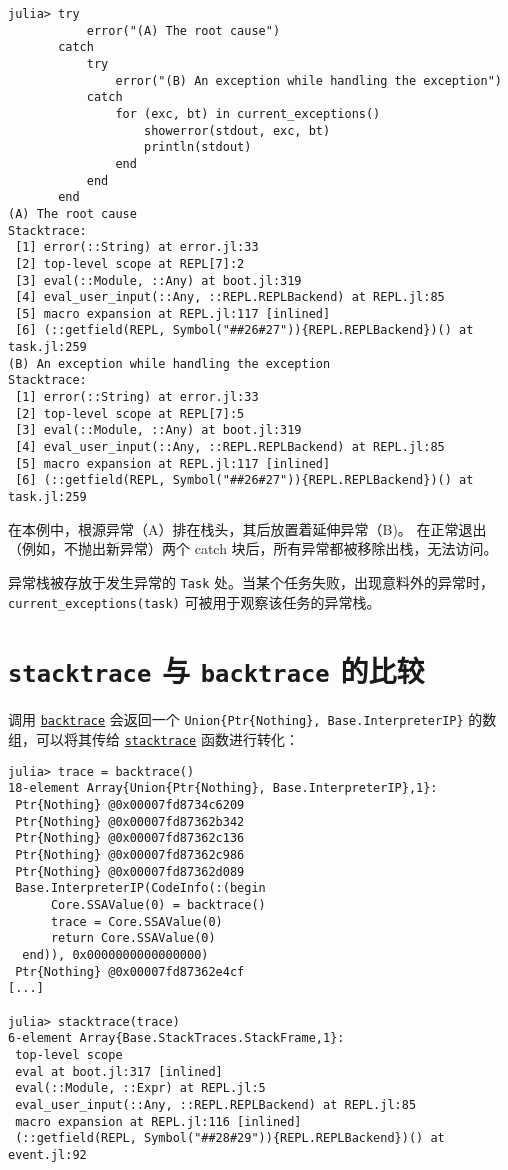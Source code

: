\begin{verbatim}
julia> try
           error("(A) The root cause")
       catch
           try
               error("(B) An exception while handling the exception")
           catch
               for (exc, bt) in current_exceptions()
                   showerror(stdout, exc, bt)
                   println(stdout)
               end
           end
       end
(A) The root cause
Stacktrace:
 [1] error(::String) at error.jl:33
 [2] top-level scope at REPL[7]:2
 [3] eval(::Module, ::Any) at boot.jl:319
 [4] eval_user_input(::Any, ::REPL.REPLBackend) at REPL.jl:85
 [5] macro expansion at REPL.jl:117 [inlined]
 [6] (::getfield(REPL, Symbol("##26#27")){REPL.REPLBackend})() at task.jl:259
(B) An exception while handling the exception
Stacktrace:
 [1] error(::String) at error.jl:33
 [2] top-level scope at REPL[7]:5
 [3] eval(::Module, ::Any) at boot.jl:319
 [4] eval_user_input(::Any, ::REPL.REPLBackend) at REPL.jl:85
 [5] macro expansion at REPL.jl:117 [inlined]
 [6] (::getfield(REPL, Symbol("##26#27")){REPL.REPLBackend})() at task.jl:259
\end{verbatim}



在本例中，根源异常（A）排在栈头，其后放置着延伸异常（B)。 在正常退出（例如，不抛出新异常）两个 catch 块后，所有异常都被移除出栈，无法访问。



异常栈被存放于发生异常的 \texttt{Task} 处。当某个任务失败，出现意料外的异常时，\texttt{current\_exceptions(task)} 可被用于观察该任务的异常栈。



\hypertarget{9581632785664784530}{}


\section{\texttt{stacktrace} 与 \texttt{backtrace} 的比较}



调用 \hyperlink{6187626674327343338}{\texttt{backtrace}} 会返回一个 \texttt{Union\{Ptr\{Nothing\}, Base.InterpreterIP\}} 的数组，可以将其传给 \hyperlink{11964270650763140298}{\texttt{stacktrace}} 函数进行转化：




\begin{verbatim}
julia> trace = backtrace()
18-element Array{Union{Ptr{Nothing}, Base.InterpreterIP},1}:
 Ptr{Nothing} @0x00007fd8734c6209
 Ptr{Nothing} @0x00007fd87362b342
 Ptr{Nothing} @0x00007fd87362c136
 Ptr{Nothing} @0x00007fd87362c986
 Ptr{Nothing} @0x00007fd87362d089
 Base.InterpreterIP(CodeInfo(:(begin
      Core.SSAValue(0) = backtrace()
      trace = Core.SSAValue(0)
      return Core.SSAValue(0)
  end)), 0x0000000000000000)
 Ptr{Nothing} @0x00007fd87362e4cf
[...]

julia> stacktrace(trace)
6-element Array{Base.StackTraces.StackFrame,1}:
 top-level scope
 eval at boot.jl:317 [inlined]
 eval(::Module, ::Expr) at REPL.jl:5
 eval_user_input(::Any, ::REPL.REPLBackend) at REPL.jl:85
 macro expansion at REPL.jl:116 [inlined]
 (::getfield(REPL, Symbol("##28#29")){REPL.REPLBackend})() at event.jl:92
\end{verbatim}



